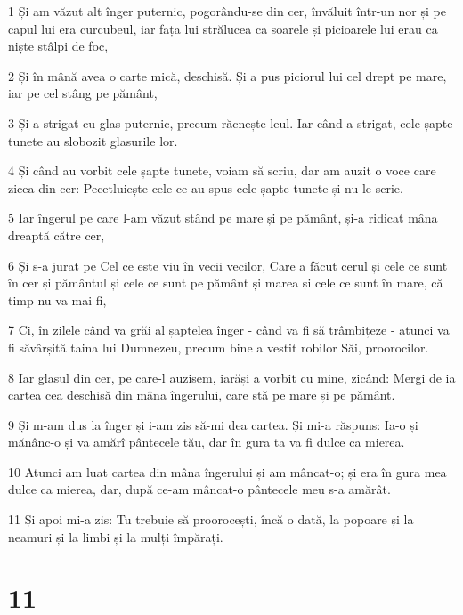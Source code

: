 \par 1 Și am văzut alt înger puternic, pogorându-se din cer, învăluit într-un nor și pe capul lui era curcubeul, iar fața lui strălucea ca soarele și picioarele lui erau ca niște stâlpi de foc,
\par 2 Și în mână avea o carte mică, deschisă. Și a pus piciorul lui cel drept pe mare, iar pe cel stâng pe pământ,
\par 3 Și a strigat cu glas puternic, precum răcnește leul. Iar când a strigat, cele șapte tunete au slobozit glasurile lor.
\par 4 Și când au vorbit cele șapte tunete, voiam să scriu, dar am auzit o voce care zicea din cer: Pecetluiește cele ce au spus cele șapte tunete și nu le scrie.
\par 5 Iar îngerul pe care l-am văzut stând pe mare și pe pământ, și-a ridicat mâna dreaptă către cer,
\par 6 Și s-a jurat pe Cel ce este viu în vecii vecilor, Care a făcut cerul și cele ce sunt în cer și pământul și cele ce sunt pe pământ și marea și cele ce sunt în mare, că timp nu va mai fi,
\par 7 Ci, în zilele când va grăi al șaptelea înger - când va fi să trâmbițeze - atunci va fi săvârșită taina lui Dumnezeu, precum bine a vestit robilor Săi, proorocilor.
\par 8 Iar glasul din cer, pe care-l auzisem, iarăși a vorbit cu mine, zicând: Mergi de ia cartea cea deschisă din mâna îngerului, care stă pe mare și pe pământ.
\par 9 Și m-am dus la înger și i-am zis să-mi dea cartea. Și mi-a răspuns: Ia-o și mănânc-o și va amărî pântecele tău, dar în gura ta va fi dulce ca mierea.
\par 10 Atunci am luat cartea din mâna îngerului și am mâncat-o; și era în gura mea dulce ca mierea, dar, după ce-am mâncat-o pântecele meu s-a amărât.
\par 11 Și apoi mi-a zis: Tu trebuie să proorocești, încă o dată, la popoare și la neamuri și la limbi și la mulți împărați.

\chapter{11}

